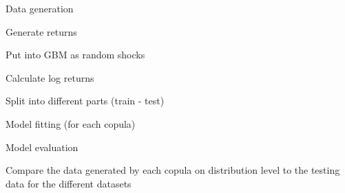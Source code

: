 \begin{generalinstructions}
    \begin{compactenum}
        \item Data generation
        \begin{compactenum}
            \item Generate returns
            \item Put into GBM as random shocks 
            \item Calculate log returns 
            \item Split into different parts (train - test)
        \end{compactenum}
        \item Model fitting (for each copula)
        \item Model evaluation
        \begin{compactenum}
            \item Compare the data generated by each copula on distribution level to the testing data for the different datasets
        \end{compactenum}
    \end{compactenum}
\end{generalinstructions}

